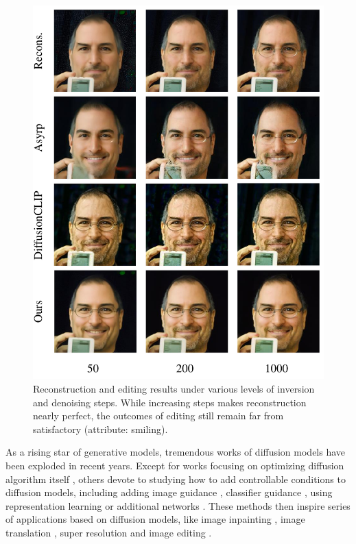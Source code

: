 \documentclass[letterpaper]{article} %
\begin{document}
\begin{figure}[t]
    \centering
    \includegraphics[width=0.9\columnwidth]{Figs/fig1.pdf}
    \caption{Reconstruction and editing results under various levels of inversion and denoising steps. While increasing steps makes reconstruction nearly perfect, the outcomes of editing still remain far from satisfactory (attribute: smiling).}
    \label{fig1}
\end{figure}

As a rising star of generative models, tremendous works of diffusion models \cite{ho2020denoising, song2020score} have been exploded in recent years. Except for works focusing on optimizing diffusion algorithm itself \cite{nichol2021improved, song2020denoising}, others devote to studying how to add controllable conditions to diffusion models, including adding image guidance \cite{choi2021ilvr}, classifier guidance \cite{dhariwal2021diffusion, avrahami2022blended}, using representation learning \cite{kwon2022diffusion} or additional networks \cite{rombach2022high, zhang2023adding}. These methods then inspire series of applications based on diffusion models, like image inpainting \cite{lugmayr2022repaint}, image translation \cite{meng2021sdedit}, super resolution \cite{ho2022cascaded} and image editing \cite{nichol2021glide, kwon2022diffusion, hertz2022prompt}.
\end{document}
